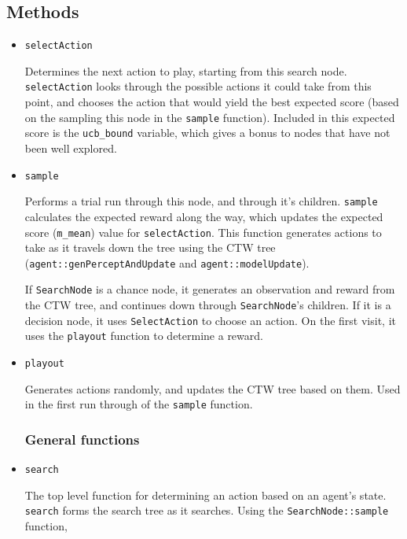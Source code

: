 \documentclass[pdftex,twoside,a4paper]{report}
\begin{document}
\subsection{Methods}
\begin{itemize}
\subsubsection*{\texttt{SearchNode}}
	\item{\texttt{selectAction}
	
	Determines the next action to play, starting from this search node. \texttt{selectAction} looks through the possible actions it could take from this point, and chooses the action that would yield the best expected score (based on the sampling this node in the \texttt{sample} function). Included in this expected score is the \texttt{ucb\_bound} variable, which gives a bonus to nodes that have not been well explored.
	}
	
	\item{\texttt{sample}
	
	Performs a trial run through this node, and through it's children. \texttt{sample} calculates the expected reward along the way, which updates the expected score (\texttt{m\_mean}) value for \texttt{selectAction}. This function generates actions to take as it travels down the tree using the CTW tree (\texttt{agent::genPerceptAndUpdate} and \texttt{agent::modelUpdate}).
	
	If \texttt{SearchNode} is a chance node, it generates an observation and reward from the CTW tree, and continues down through \texttt{SearchNode}'s children. If it is a decision node, it uses \texttt{SelectAction} to choose an action. On the first visit, it uses the \texttt{playout} function to determine a reward.
	}
	
	\item{\texttt{playout}
	
	Generates actions randomly, and updates the CTW tree based on them. Used in the first run through of the \texttt{sample} function. 
	}
\subsubsection{General functions}
\item{\texttt{search}
	
	The top level function for determining an action based on an agent's state. \texttt{search} forms the search tree as it searches. Using the \texttt{SearchNode::sample} function,
	}
	
\end{itemize}
\end{document}
